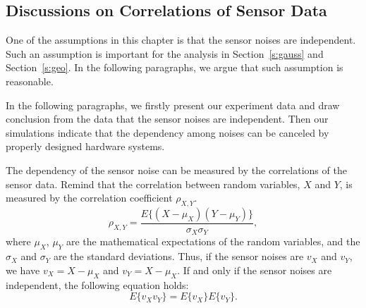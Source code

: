 



\subsection{Discussions on Correlations of Sensor Data}
One of the assumptions in this chapter is that the sensor noises are independent. Such an assumption is important for the analysis in Section~\ref{s:gauss} and Section~\ref{s:geo}. In the following paragraphs, we argue that such assumption is reasonable.

In the following paragraphs, we firstly present our experiment data and draw conclusion from the data that the sensor noises are independent. Then our simulations indicate that the dependency among noises can be canceled by properly designed hardware systems.

The dependency of the sensor noise can be measured by the correlations of the sensor data.
Remind that the correlation between random variables, $X$ and $Y$, is measured by the correlation coefficient $\rho_{X,Y}$.
    \begin{equation*}\label{e:rhoxy}
        \rho_{X,Y} =\frac{E\{(X-\mu_X)(Y-\mu_Y)\}}{\sigma_X \sigma_Y},
    \end{equation*}
    where $\mu_X$, $\mu_Y$ are the mathematical expectations of the random variables, and the $\sigma_X$ and $\sigma_Y$ are the standard deviations. Thus, if the sensor noises
    are $v_X$ and $v_Y$, we have $v_X=X-\mu_X$ and $v_Y=X-\mu_X$.
    If and only if the sensor noises are independent, the following equation holds:
    \begin{equation*}\label{e:ind}
        E\{v_X v_Y\} = E\{v_X\}E\{v_Y\}.
    \end{equation*}


